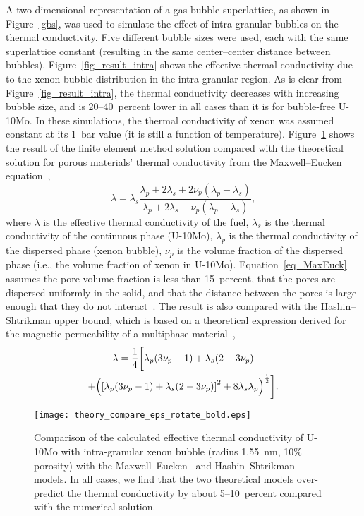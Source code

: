 A two-dimensional representation of a gas bubble superlattice, as shown in
Figure~\ref{gbs}, was used to simulate the effect of intra-granular bubbles on the thermal conductivity.
Five different bubble sizes were used, each with the same superlattice
constant (resulting in the same center--center distance between bubbles).
Figure~\ref{fig_result_intra} shows the effective thermal conductivity due to the xenon bubble distribution in the intra-granular region.
As is clear from Figure~\ref{fig_result_intra}, the thermal conductivity decreases with increasing bubble size, and is 20--40~percent lower in all cases than it is for bubble-free U-10Mo. In these simulations, the thermal conductivity of xenon was assumed constant at its 1~bar value (it is still a function of temperature).
Figure~\ref{fig_compare} shows the result of the finite element method solution compared with the theoretical solution for porous materials' thermal conductivity from the Maxwell--Eucken equation~\cite{maxwell1881treatise}, 
\begin{equation}
	\lambda = \lambda_s\frac{\lambda_p+2\lambda_s+2\nu_p(\lambda_p-\lambda_s)}{\lambda_p+2\lambda_s-\nu_p(\lambda_p-\lambda_s)},
	\label{eq_MaxEuck}
\end{equation}
where $\lambda$ is the effective thermal conductivity of the fuel, $\lambda_s$ is the thermal conductivity of the continuous phase (U-10Mo), $\lambda_p$ is the thermal conductivity of the dispersed phase (xenon bubble), $\nu_p$ is the volume fraction of the dispersed phase (i.e., the volume fraction of xenon in U-10Mo). Equation~\eqref{eq_MaxEuck} assumes the pore volume fraction is less than 15~percent, that the pores are dispersed uniformly in the solid, and that the distance between the pores is large enough that they do not interact~\cite{clark2003monolithic,smith2013thermal}. The result is also compared with the Hashin--Shtrikman upper bound, which is based on a theoretical expression derived for the magnetic permeability of a multiphase material~\cite{hashin1962variational},
\begin{multline}
\lambda = \frac{1}{4}\biggl[ \lambda_p(3\nu_p-1) + \lambda_s(2-3\nu_p) \\
   +
   \Bigl( \left[ \lambda_p (3\nu_p -1) + \lambda_s(2-3\nu_p) \right]^2 + 8\lambda_s\lambda_p \Bigr)^{\frac{1}{2}}
    \biggr].
\label{eq:Hash-Sht}
\end{multline}

\begin{figure}%
	\centering
	\texttt{[image: theory\_compare\_eps\_rotate\_bold.eps]}
	\caption{Comparison of the calculated effective thermal conductivity of U-10Mo with intra-granular xenon bubble (radius 1.55~nm, 10$\%$ porosity) with the Maxwell--Eucken~\cite{maxwell1881treatise} and Hashin--Shtrikman~\cite{hashin1962variational} models. In all cases, we find that the
      two theoretical models over-predict the thermal conductivity by about
      5--10~percent compared with the numerical solution.}
	\label{fig_compare}
\end{figure}


